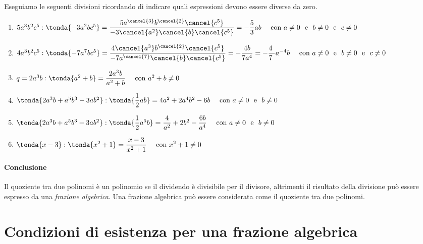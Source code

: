  \begin{esempio} 
Eseguiamo le seguenti divisioni ricordando di indicare quali espressioni 
devono essere diverse da zero.
\begin{enumerate}
\item 
\(5a^{3}b^{2}c^{5}: \tonda{-3a^{2}bc^{5}} =
    \dfrac{5a^{\cancel{3}}b^{\cancel{2}}{\cancel{c^5}}}
          {-3\cancel{a^{2}}\cancel{b}\cancel{c^{5}}}=
    -\dfrac{5}{3}ab 
      \quad \text{ con } a \ne 0 \stext{e} b \ne 0 \stext{e} c \ne 0\)
\item 
\(4a^{3}b^{2}c^{5} : \tonda{-7a^{7}bc^{5}} =
    \dfrac{4\cancel{a^{3}}b^{\cancel{2}}\cancel{c^{5}}}
          {-7a^{\cancel{7}}\cancel{b}\cancel{c^{5}}}= 
    -{\dfrac{4b}{7a^{4}}}=
    -{\dfrac{4~}{7~}}a^{-4}b
       \quad \text{ con } a \ne 0 \stext{e} b \ne 0 \stext{e} c \ne 0\)
\item 
\(q=2a^{3}b: \tonda{a^{2}+b} =\dfrac{2a^{3}b}{a^{2}+b}
       \quad \text{ con } a^{2}+b \ne 0\)
\item 
\(\tonda{2a^{3}b+a^{5}b^{3}-3ab^{2}} : \tonda{\dfrac{1}{2}ab} =
  4a^{2}+2a^{4}b^{2}-6b
       \quad \text{ con } a \ne 0 \stext{e} b \ne 0\)
\item 
\(\tonda{2a^{3}b+a^{5}b^{3}-3ab^{2}} : \tonda{\dfrac{1}{2}a^{5}b} =
  \dfrac{4}{a^{2}}+2b^{2}-\dfrac{6b}{a^{4}}
       \quad \text{ con } a \ne 0 \stext{e} b \ne 0\)
\item 
\(\tonda{x-3} : \tonda{x^{2}+1}=\dfrac{x-3}{x^{2}+1}
       \quad \text{ con } x^{2}+1 \ne 0\)
\end{enumerate}

 \end{esempio}

\paragraph{Conclusione}
Il quoziente tra due polinomi è un polinomio se il dividendo è divisibile 
per il divisore, altrimenti il risultato della divisione può essere espresso 
da una \emph{frazione algebrica}.
Una frazione algebrica può essere considerata come il quoziente tra due 
polinomi.

\section{Condizioni di esistenza per una frazione algebrica}
\label{sec:frazalg_condizioniesistenza}

